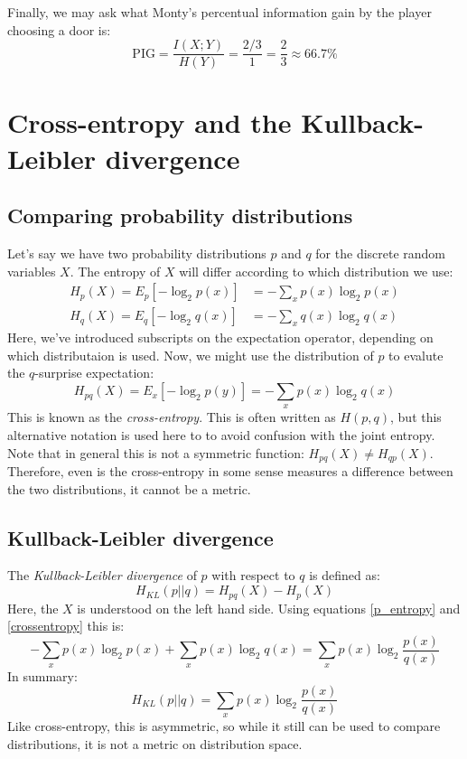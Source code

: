 \documentclass[12pt, a4paper]{article}
\numberwithin{equation}{section}
\begin{document}
Finally, we may ask what Monty's percentual information gain by the player choosing a door is:
\begin{equation}
\textrm{PIG}=\frac{I(X;Y)}{H(Y)}=\frac{2/3}{1}=\frac{2}{3}\approx 66.7\%
\end{equation}

\section{Cross-entropy and the Kullback-Leibler divergence}

\subsection{Comparing probability distributions}
Let's say we have two probability distributions $p$ and $q$ for the discrete random variables $X$. The entropy of $X$ will differ according to which distribution we use:
\begin{align}
\label{p_entropy}
H_p(X)=E_p[-\log_2 p(x)]&=-\sum_x p(x)\log_2 p(x)\\
H_q(X)=E_q[-\log_2 q(x)]&=-\sum_x q(x)\log_2 q(x)
\end{align}
Here, we've introduced subscripts on the expectation operator, depending on which distributaion is used. Now, we might use the distribution of $p$ to evalute the $q$-surprise expectation: 
\begin{equation}
\label{crossentropy}
H_{pq}(X)=E_x[-\log_2 p(y)]=-\sum_x p(x)\log_2 q(x)
\end{equation}
This is known as the \textit{cross-entropy}. This is often written as $H(p,q)$, but this alternative notation is used here to to avoid confusion with the joint entropy. Note that in general this is not a symmetric function: $H_{pq}(X)\neq H_{qp}(X)$. Therefore, even is the cross-entropy in some sense measures a difference between the two distributions, it cannot be a metric.

\subsection{Kullback-Leibler divergence}
The \textit{Kullback-Leibler divergence} of $p$ with respect to $q$ is defined as:
\begin{equation}
H_{KL}(p||q)=H_{pq}(X)-H_p(X)
\end{equation} 
Here, the $X$ is understood on the left hand side. Using equations \ref{p_entropy} and \ref{crossentropy} this is:
\begin{equation}
-\sum_x p(x)\log_2 p(x)+\sum_x p(x)\log_2 q(x)=\sum_x p(x)\log_2\frac{p(x)}{q(x)}
\end{equation}
In summary:
\begin{equation}
\label{kl_divergence}
H_{KL}(p||q)=\sum_x p(x)\log_2\frac{p(x)}{q(x)}
\end{equation}
Like cross-entropy, this is asymmetric, so while it still can be used to compare distributions, it is not a metric on distribution space.
\end{document}
